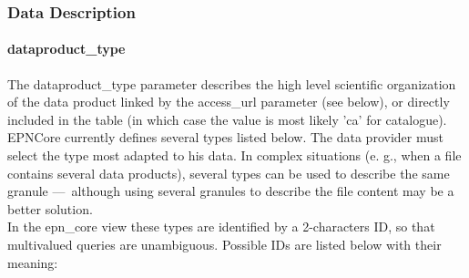 \documentclass[11pt,a4paper]{ivoa}
\begin{document}
\subsubsection{Data Description}

\paragraph{dataproduct\_type}

The dataproduct\_type parameter describes the high level scientific organization of the data product linked by the access\_url parameter (see below), or directly included in the table (in which case the value is most likely 'ca' for catalogue). EPNCore currently defines several types listed below. The data provider must select the type most adapted to his data. In complex situations (e. g., when a file contains several data products), several types can be used to describe the same granule — although using several granules to describe the file content may be a better solution. \\ In the epn\_core view these types are identified by a 2-characters ID, so that multivalued queries are unambiguous. Possible IDs are listed below with their meaning:

\\
\end{document}
